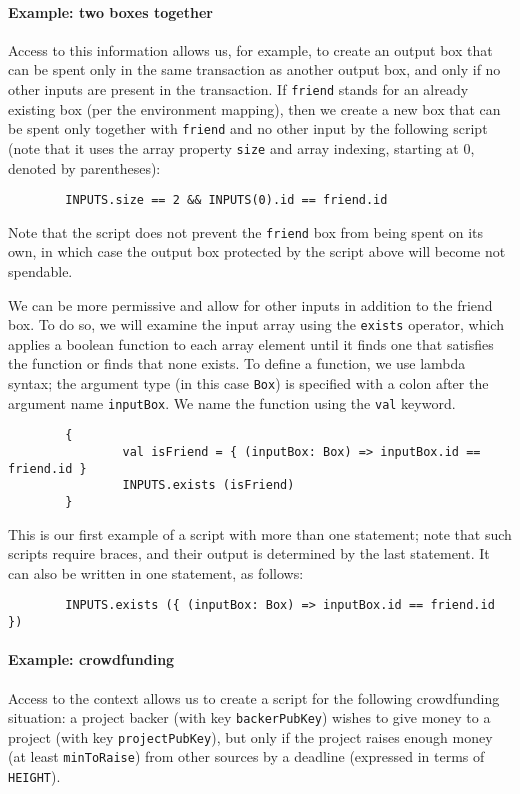 \documentclass[11pt]{article}
\newcommand{\authnote}[2]{\marginpar{\parbox{\marginparwidth}{\tiny %
  \textsf{#1 {\textcolor{blue}{notes: #2}}}}}%
  \textcolor{blue}{\textbf{\dag}}}
\newcommand{\authnote}[2]{
  \textsf{#1 \textcolor{blue}{: #2}}}
\newcommand{\authnote}[2]{}
\newcommand{\lnote}[1]{{\authnote{\textcolor{orange}{Leo notes}}{#1}}}
\begin{document}
\lnote{ The comments in ErgoBox.scala says something about a unique nonce, but that doesn't seem to be matched by code. }

\paragraph{Example: two boxes together}
Access to this information allows us, for example, to create an output box that can be spent only in the same transaction as another output box, and only if no other inputs are present in the transaction. If \texttt{friend} stands for an already existing box (per the environment mapping), then we create a new box that can be spent only together with \texttt{friend} and no other input by the following script (note that it uses the array property \texttt{size} and array indexing, starting at 0, denoted by parentheses):

\begin{verbatim}
        INPUTS.size == 2 && INPUTS(0).id == friend.id
\end{verbatim}

Note that the script does not prevent the \texttt{friend} box from being spent on its own, in which case the output box protected by the script above will become not spendable.

We can be more permissive and allow for other inputs in addition to the friend box. To do so, we will examine the input array using the \texttt{exists} operator, which applies a boolean function to each array element until it finds one that satisfies the function or finds that none exists. To define a function, we use lambda syntax; the argument type (in this case \texttt{Box}) is specified with a colon after the argument name \texttt{inputBox}. We name the function using the \texttt{val} keyword.
\begin{verbatim}
        {
                val isFriend = { (inputBox: Box) => inputBox.id == friend.id }
                INPUTS.exists (isFriend)
        }
\end{verbatim}

This is our first example of a script with more than one statement; note that such scripts require braces, and their output is determined by the last statement.
It can also be written in one statement, as follows:
\begin{verbatim}
        INPUTS.exists ({ (inputBox: Box) => inputBox.id == friend.id })
\end{verbatim}


\paragraph{Example: crowdfunding}
Access to the context allows us to create a script for the following crowdfunding situation: a project backer (with key  \texttt{backerPubKey}) wishes to give money to a project (with key \texttt{projectPubKey}), but only if the project raises enough money (at least \texttt{minToRaise}) from other sources by a deadline (expressed in terms of \texttt{HEIGHT}). 
\end{document}
